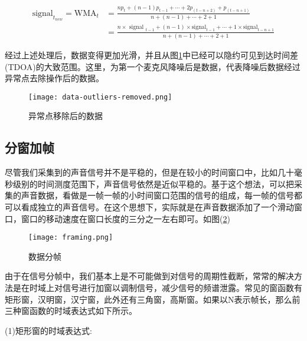 \documentclass[winfonts,oneside]{njuthesis}
\begin{document}
			\begin{equation}
			\begin{aligned}
				\text{signal}_{t_{new}} = \text{WMA}_{t}&=\frac{n p_{t}+(n-1) p_{t-1}+\cdots+2 p_{(t-n+2)}+p_{(t-n+1)}}{n+(n-1)+\cdots+2+1}\\
											  &=\frac{n \times \text { signal }_{t-1}+(n-1) \times \text {signal}_{t-1}+\cdots+1 \times \text {signal}_{t-n+1}}{n+(n-1)+\cdots+2+1}								 
			\end{aligned}
			\end{equation}
			
			经过上述处理后，数据变得更加光滑，并且从图\ref{fig: data-outliers-removed}中已经可以隐约可见到达时间差(TDOA)的大致范围。这里，为第一个麦克风降噪后是数据，代表降噪后数据经过异常点去除操作后的数据。
			
			\begin{figure}[H]
				\centering
				\texttt{[image: data-outliers-removed.png]} 
				\caption{异常点移除后的数据}
				\label{fig: data-outliers-removed}
			\end{figure}
		
		\subsection{分窗加帧}
		
			尽管我们采集到的声音信号并不是平稳的，但是在较小的时间窗口中，比如几十毫秒级别的时间测度范围下，声音信号依然是近似平稳的。基于这个想法，可以把采集的声音数据，看做是一帧一帧的小时间窗口范围的信号的组成，每一帧的信号都可以看成独立的声音信号。在这个思想下，实际就是在声音数据添加了一个滑动窗口，窗口的移动速度在窗口长度的三分之一左右即可。如图(\ref{fig: framing})
					
			\begin{figure}[H]
				\centering
				\texttt{[image: framing.png]} 
				\caption{数据分帧}
				\label{fig: framing}
			\end{figure}
		
			由于在信号分帧中，我们基本上是不可能做到对信号的周期性截断，常常的解决方法是在时域上对信号进行加窗以调制信号，减少信号的频谱泄露。常见的窗函数有矩形窗，汉明窗，汉宁窗，此外还有三角窗，高斯窗\cite{Window_function}。如果以N表示帧长，那么前三种窗函数的时域表达式如下所示。
			
			(1)矩形窗的时域表达式:
			
\end{document}
